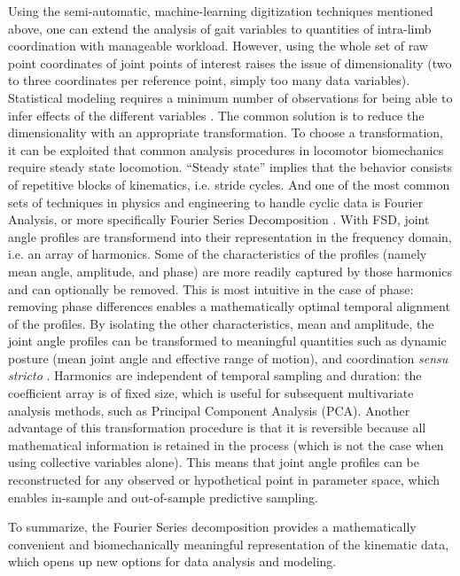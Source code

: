 Using the semi-automatic, machine-learning digitization techniques mentioned above, one can extend the analysis of gait variables to quantities of intra-limb coordination with manageable workload.
However, using the whole set of raw point coordinates of joint points of interest raises the issue of dimensionality (two to three coordinates per reference point, simply too many data variables).
Statistical modeling requires a minimum number of observations for being able to infer effects of the different variables \citep{Frick1996,Maxwell2017,Riley2020,Austin2015}.
The common solution is to reduce the dimensionality with an appropriate transformation.
To choose a transformation, it can be exploited that common analysis procedures in locomotor biomechanics require steady state locomotion.
``Steady state'' implies that the behavior consists of repetitive blocks of kinematics, i.e. stride cycles.
And one of the most common sets of techniques in physics and engineering to handle cyclic data is Fourier Analysis, or more specifically Fourier Series Decomposition \citep[FSD;][]{Mielke2019,Webb2007,Fourier1822,Bracewell2000,Gray1995,Pike2002}.
With FSD, joint angle profiles are transformend into their representation in the frequency domain, i.e. an array of harmonics.
Some of the characteristics of the profiles (namely mean angle, amplitude, and phase) are more readily captured by those harmonics and can optionally be removed.
This is most intuitive in the case of phase: removing phase differences enables a mathematically optimal temporal alignment of the profiles.
By isolating the other characteristics, mean and amplitude, the joint angle profiles can be transformed to meaningful quantities such as dynamic posture (mean joint angle and effective range of motion), and coordination \emph{sensu stricto} \citep[relative phase/joint timing and residual kinematics, \textit{cf.}][]{Mielke2019}.
Harmonics are independent of temporal sampling and duration: the coefficient array is of fixed size, which is useful for subsequent multivariate analysis methods, such as Principal Component Analysis (PCA).
Another advantage of this transformation procedure is that it is reversible because all mathematical information is retained in the process (which is not the case when using collective variables alone).
This means that joint angle profiles can be reconstructed for any observed or hypothetical point in parameter space, which enables in-sample and out-of-sample predictive sampling.

To summarize, the Fourier Series decomposition provides a mathematically convenient and biomechanically meaningful representation of the kinematic data, which opens up new options for data analysis and modeling.


